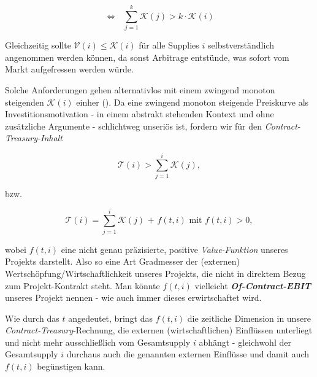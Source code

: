 \begin{Fazit}
\begin{equation*}
\Leftrightarrow \textrm{    } \sum_{j = 1}^{k} \mathcal{K} \left( j \right) > k \cdot \mathcal{K} \left( i \right)
\end{equation*} 

Gleichzeitig sollte $\mathcal{V} \left( i \right) \leq \mathcal{K} \left( i \right)$ für alle Supplies $i$ selbstverständlich angenommen werden können, da sonst Arbitrage entstünde, was sofort vom Markt aufgefressen werden würde.

\vspace{0.2cm}

Solche Anforderungen gehen alternativlos mit einem zwingend monoton steigenden $\mathcal{K} \left( i \right)$ einher ().
Da eine zwingend monoton steigende Preiskurve als Investitionsmotivation - in einem abstrakt stehenden Kontext und ohne zusätzliche Argumente - schlichtweg unseriös ist, fordern wir für den \textit{Contract-Treasury-Inhalt}

\begin{equation*}
\mathcal{T} \left( i \right) > \sum_{j = 1}^{i} \mathcal{K} \left( j \right),
\end{equation*} 

bzw.

\begin{equation*}
\mathcal{T} \left( i \right) = \sum_{j = 1}^{i} \mathcal{K} \left( j \right) \textrm{  +  } f(t, i) \textrm{ mit } f(t, i) > 0,
\end{equation*} 

wobei $f(t, i)$ eine nicht genau präzisierte, positive \textit{Value-Funktion} unseres Projekts darstellt. Also so eine Art Gradmesser der (externen) Wertschöpfung/Wirtschaftlich\-keit unseres Projekts, die nicht in direktem Bezug zum Projekt-Kontrakt steht. Man könnte $f(t, i)$ vielleicht \textbf{\textit{Of-Contract-EBIT}} unseres Projekt nennen - wie auch immer dieses erwirtschaftet wird. 

Wie durch das $t$ angedeutet, bringt das $f(t, i)$ die zeitliche Dimension in unsere \textit{Contract-Treasury}-Rechnung, die externen (wirtschaftlichen) Einflüssen unterliegt und nicht mehr ausschließlich vom Gesamtsupply $i$ abhängt - gleichwohl der Gesamtsupply $i$ durchaus auch die genannten externen Einflüsse und damit auch $f(t, i)$ begünstigen kann.

\end{Fazit}


